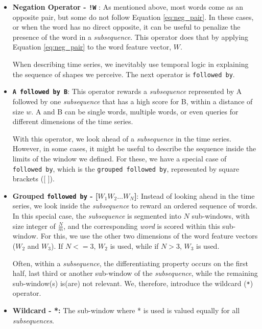 \begin{itemize}

\item \textbf{Negation Operator  - \texttt{!W}} : As mentioned above, most words come as an opposite pair, but some do not follow Equation \ref{eq:neg_pair}. In these cases, or when the word has no direct opposite, it can be useful to penalize the presence of the word in a \textit{subsequence}. This operator does that by applying Equation \ref{eq:neg_pair} to the word feature vector, $W$. 

When describing time series, we inevitably use temporal logic in explaining the sequence of shapes we perceive. The next operator is \texttt{followed by}.
 
\item \textbf{\texttt{A followed by B}}: This operator rewards a \textit{subsequence} represented by A followed by one \textit{subsequence} that has a high score for B, within a distance of size $w$. A and B can be single words, multiple words, or even queries for different dimensions of the time series.

With this operator, we look ahead of a \textit{subsequence} in the time series. However, in some cases, it might be useful to describe the sequence inside the limits of the window we defined. For these, we have a special case of \texttt{followed by}, which is the \texttt{grouped followed by}, represented by square brackets ([ ]). 

\item	\textbf{Grouped \texttt{followed by} - [$W_1 W_2 … W_N$]}: Instead of looking ahead in the time series, we look inside the \textit{subsequence} to reward an ordered sequence of words. In this special case, the \textit{subsequence} is segmented into $N$ sub-windows, with size integer of $\frac{N}{m}$, and the corresponding \textit{word} is scored within this sub-window. For this, we use the other two dimensions of the word feature vectors ($W_2$ and $W_3$). If $N<=3$, $W_2$ is used, while if $N>3$, $W_3$ is used.

Often, within a \textit{subsequence}, the differentiating property occurs on the first half, last third or another sub-window of the \textit{subsequence}, while the remaining sub-window(s) is(are) not relevant. We, therefore, introduce the wildcard (\texttt{*}) operator.

\item \textbf{Wildcard - *:} The sub-window where * is used is valued equally for all \textit{subsequences}.
\end{itemize}

